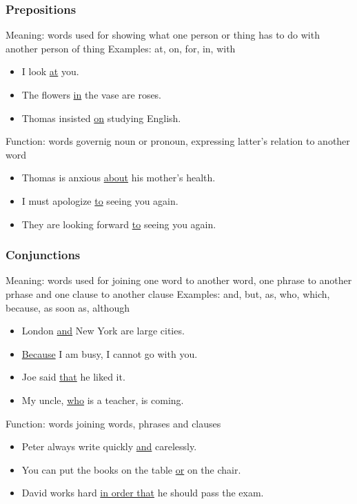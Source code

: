 \subsubsection{Prepositions}
Meaning: words used for showing what one person or thing has to do with another
person of thing
\newline
\newline
Examples: at, on, for, in, with
\begin{itemize}
    \item I look \underline{at} you.
    \item The flowers \underline{in} the vase are roses.
    \item Thomas insisted \underline{on} studying English.
\end{itemize}

Function: words governig noun or pronoun, expressing latter's relation to
another word
\begin{itemize}
    \item Thomas is anxious \underline{about} his mother's health.
    \item I must apologize \underline{to} seeing you again.
    \item They are looking forward \underline{to} seeing you again.
\end{itemize}

\subsubsection{Conjunctions}
Meaning: words used for joining one word to another word, one phrase to another
prhase and one clause to another clause
\newline
\newline
Examples: and, but, as, who, which, because, as soon as, although
\begin{itemize}
    \item London \underline{and} New York are large cities.
    \item \underline{Because} I am busy, I cannot go with you.
    \item Joe said \underline{that} he liked it.
    \item My uncle, \underline{who} is a teacher, is coming.
\end{itemize}

Function: words joining words, phrases and clauses
\begin{itemize}
    \item Peter always write quickly \underline{and} carelessly.
    \item You can put the books on the table \underline{or} on the chair.
    \item David works hard \underline{in order that} he should pass the exam.
\end{itemize}

